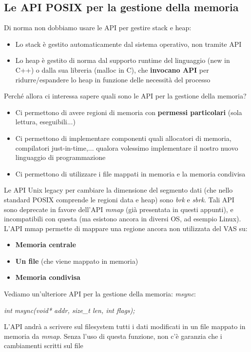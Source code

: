 \documentclass[12pt]{article}
\begin{document}
\subsection{Le API POSIX per la gestione della memoria}
Di norma non dobbiamo usare le API per gestire stack e heap:
\begin{itemize}
    \item Lo stack è gestito automaticamente dal sistema operativo, non tramite API
    \item Lo heap è gestito di norma dal supporto runtime del linguaggio (new in C++) o dalla sua libreria (malloc in C), che \textbf{invocano API} per ridurre/espandere lo heap in funzione
    delle necessità del processo
\end{itemize}
Perché allora ci interessa sapere quali sono le API per la gestione della memoria?
\begin{itemize}
    \item Ci permettono di avere regioni di memoria con \textbf{permessi particolari} (sola lettura, eseguibili...)
    \item Ci permettono di implementare componenti quali allocatori di memoria, compilatori just-in-time,... qualora volessimo implementare il nostro nuovo linguaggio di programmazione
    \item Ci permettono di utilizzare i file mappati in memoria e la memoria condivisa
\end{itemize}
Le API Unix legacy per cambiare la dimensione del segmento dati (che nello standard POSIX comprende le regioni data e heap) sono \textit{brk} e \textit{sbrk}.
Tali API sono deprecate in favore dell'API \textit{mmap} (già presentata in questi appunti), e incompatibili con questa (ma esistono ancora in diversi OS, ad esempio Linux).
L'API mmap permette di mappare una regione ancora non utilizzata del VAS su:
\begin{itemize}
    \item \textbf{Memoria centrale}
    \item \textbf{Un file} (che viene mappato in memoria)
    \item \textbf{Memoria condivisa}
\end{itemize}
Vediamo un'ulteriore API per la gestione della memoria: \textit{msync}:
\begin{center}
    \textit{int msync(void* addr, size\_t len, int flags);}
\end{center}
L'API andrà a scrivere sul filesystem tutti i dati modificati in un file mappato in memoria 
da \textit{mmap}. Senza l'uso di questa funzione, non c'è garanzia che i cambiamenti scritti sul file
\end{document}
